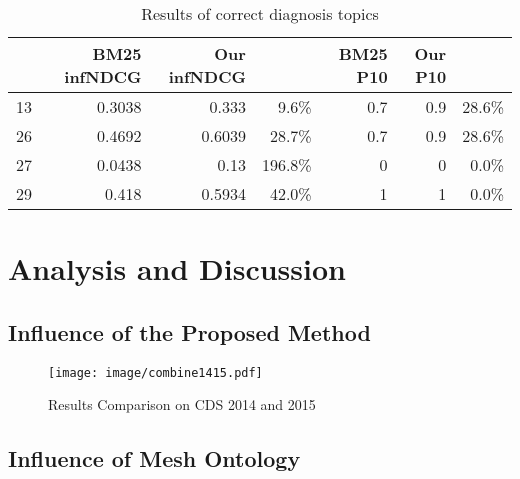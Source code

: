 \documentclass{IEEEtran}
\begin{document}
\begin{table*}[htbp]
  \centering
  \renewcommand\arraystretch{1.2}
  \caption{Results of correct diagnosis topics}
    \begin{tabular}{rrrrrrr}
    \toprule
          & BM25 infNDCG & Our infNDCG &  & BM25 P10 & Our P10 &  \\
    \midrule
    13    & 0.3038 & 0.333 & 9.6\% & 0.7   & 0.9   & 28.6\% \\
    26    & 0.4692 & 0.6039 & 28.7\% & 0.7   & 0.9   & 28.6\% \\
    27    & 0.0438 & 0.13  & 196.8\% & 0     & 0     & 0.0\% \\
    29    & 0.418 & 0.5934 & 42.0\% & 1     & 1     & 0.0\% \\
    \bottomrule
    \end{tabular}%
  \label{tab:addlabel}%
\end{table*}%


\section{Analysis and Discussion}
\subsection{Influence of the Proposed Method}
\begin{figure}[htbp]
\centering\texttt{[image: image/combine1415.pdf]}
\caption{Results Comparison on CDS 2014 and 2015}\label{fig:1}
\end{figure}


\begin{figure}
  \centering
\end{figure}

\subsection{Influence of Mesh Ontology}
\begin{figure}
  \centering
\end{figure}
\end{document}
